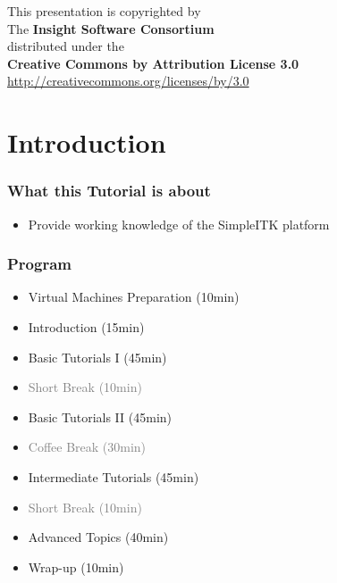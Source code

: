 {
\begin{frame}[plain]
\center
\begin{center}
This presentation is copyrighted by\\
The \textbf{Insight Software Consortium}\\
\bigskip
distributed under the\\
\textbf{Creative Commons by Attribution License 3.0}\\
\url{http://creativecommons.org/licenses/by/3.0}\\
\end{center}
\end{frame}
}

\section{Introduction}

\begin{frame}
\frametitle{What this Tutorial is about}
\begin{itemize}
\item Provide working knowledge of the SimpleITK platform
\end{itemize}
\end{frame}

\begin{frame}
\frametitle{Program}

\begin{itemize}
\item Virtual Machines Preparation (10min)
\item Introduction (15min)
\item Basic Tutorials I (45min)
\item \textcolor{gray}{Short Break (10min)}
\item Basic Tutorials II (45min)
\item \textcolor{gray}{Coffee Break (30min)}
\item Intermediate Tutorials (45min)
\item \textcolor{gray}{Short Break (10min)}
\item Advanced Topics (40min)
\item Wrap-up (10min)
\end{itemize}

\end{frame}
